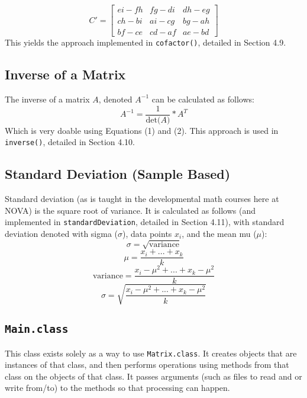 \documentclass[12pt]{article}
\begin{document}
\begin{equation}
C' =
    \begin{bmatrix}
    e i - f h & f g - d i & d h - e g \\
    c h - b i & a i - c g & b g - a h \\
    b f - c e & c d - a f & a e - b d
\end{bmatrix}
\end{equation}
This yields the approach implemented in \texttt{cofactor()}, detailed in Section 4.9.

\subsection{Inverse of a Matrix}
The inverse of a matrix $A$, denoted $A^{-1}$ can be calculated as follows:
\begin{equation}
    A^{-1} = \frac{1}{\text{det($A$)}} * A^T
\end{equation}
Which is very doable using Equations (1) and (2). This approach is used in \texttt{inverse()}, detailed in Section 4.10.

\subsection{Standard Deviation (Sample Based)}
Standard deviation (as is taught in the developmental math courses here at NOVA) is the square root of variance. It is calculated as follows (and implemented in \texttt{standardDeviation}, detailed in Section 4.11), with standard deviation denoted with sigma ($\sigma$), data points $x_i$, and the mean mu ($\mu$):
\begin{equation*}
    \sigma = \sqrt{\text{variance}}
\end{equation*}
\begin{equation*}
    \mu = \frac{x_i + ... + x_k}{k}
\end{equation*}
\begin{equation*}
    \text{variance} = \frac{{x_i - \mu}^2 + ... + {x_k - \mu}^2}{k}
\end{equation*}
\begin{equation}
    \sigma = \sqrt{\frac{{x_i - \mu}^2 + ... + {x_k - \mu}^2}{k}}
\end{equation}



\newpage %



\begin{center}
\section{\texttt{Main.class}}
\end{center}
This class exists solely as a way to use \texttt{Matrix.class}. It creates objects that are instances of that class, and then performs operations using methods from that class on the objects of that class. It passes arguments (such as files to read and or write from/to) to the methods so that processing can happen.
\end{document}
